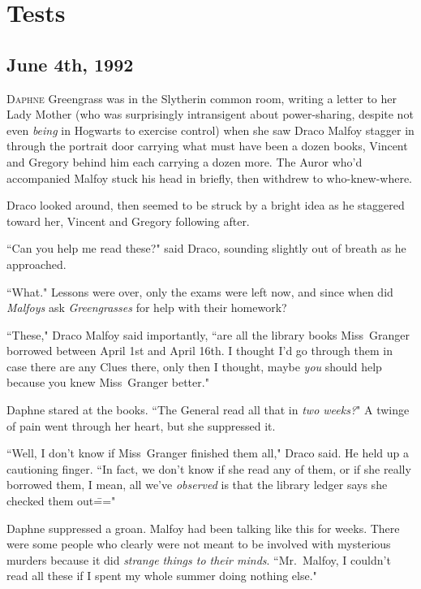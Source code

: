 \chapter{Tests}

\section{June 4th, 1992}

\lettrine{D}{aphne} Greengrass was in the Slytherin common room, writing a letter to her Lady Mother (who was surprisingly intransigent about power-sharing, despite not even \emph{being} in Hogwarts to exercise control) when she saw Draco Malfoy stagger in through the portrait door carrying what must have been a dozen books, Vincent and Gregory behind him each carrying a dozen more. The Auror who'd accompanied Malfoy stuck his head in briefly, then withdrew to who-knew-where.

Draco looked around, then seemed to be struck by a bright idea as he staggered toward her, Vincent and Gregory following after.

``Can you help me read these?" said Draco, sounding slightly out of breath as he approached.

``What." Lessons were over, only the exams were left now, and since when did \emph{Malfoys} ask \emph{Greengrasses} for help with their homework?

``These," Draco Malfoy said importantly, ``are all the library books Miss~Granger borrowed between April 1st and April 16th. I thought I'd go through them in case there are any Clues there, only then I thought, maybe \emph{you} should help because you knew Miss~Granger better."

Daphne stared at the books. ``The General read all that in \emph{two weeks?}" A twinge of pain went through her heart, but she suppressed it.

``Well, I don't know if Miss~Granger finished them all," Draco said. He held up a cautioning finger. ``In fact, we don't know if she read any of them, or if she really borrowed them, I mean, all we've \emph{observed} is that the library ledger says she checked them out\==="

Daphne suppressed a groan. Malfoy had been talking like this for weeks. There were some people who clearly were not meant to be involved with mysterious murders because it did \emph{strange things to their minds}. ``Mr.~Malfoy, I couldn't read all these if I spent my whole summer doing nothing else."

